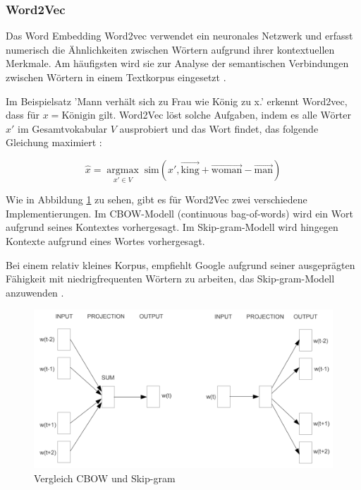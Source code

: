 \subsubsection{Word2Vec}
\label{sec:word2vec}

Das Word Embedding Word2vec verwendet ein neuronales Netzwerk und erfasst numerisch die Ähnlichkeiten zwischen Wörtern aufgrund ihrer 
kontextuellen Merkmale. Am häufigsten wird sie zur Analyse der semantischen Verbindungen zwischen Wörtern in einem Textkorpus 
eingesetzt \cite{schumacher2024word2vec}.

Im Beispielsatz 'Mann verhält sich zu Frau wie König zu x.' erkennt Word2vec, dass für $x = \text{Königin}$ gilt. 
Word2Vec löst solche Aufgaben, indem es alle Wörter $x'$ im Gesamtvokabular $V$ ausprobiert 
und das Wort findet, das folgende Gleichung maximiert \cite{CHURCH_2017}:

\begin{equation}
    \hat{x} = \underset{x' \in V}{\operatorname{argmax}} \; \text{sim}(x', \vec{\text{king}} + \vec{\text{woman}} - \vec{\text{man}})
\end{equation}

Wie in Abbildung \ref{fig:cbow_skipgram} zu sehen, gibt es für Word2Vec zwei verschiedene Implementierungen.
Im CBOW-Modell (continuous bag-of-words) wird ein Wort aufgrund seines Kontextes vorhergesagt.
Im Skip-gram-Modell wird hingegen Kontexte aufgrund eines Wortes vorhergesagt.

Bei einem relativ kleines Korpus, empfiehlt Google aufgrund seiner ausgeprägten Fähigkeit mit niedrigfrequenten Wörtern zu arbeiten, 
das Skip-gram-Modell anzuwenden \cite{schumacher2024word2vec}.

\begin{figure}[htbp]
    \begin{center}
        \includegraphics[scale=0.6]{static/cbow_skipgram.png}
        \caption{\label{fig:cbow_skipgram} Vergleich CBOW und Skip-gram \cite{mikolov2013}}
    \end{center}
\end{figure}

